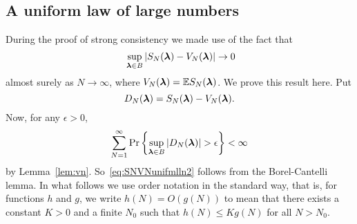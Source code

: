 \documentclass[journal]{IEEEtran}
\begin{document}
 
% 
 
 
% 
\small 
 


\normalsize
\appendix


\subsection{A uniform law of large numbers} \label{app:uniform-law-large}

During the proof of strong consistency we made use of the fact that
\begin{equation}~\label{eq:SNVNunifmlln2}
\sup_{\lambdabf \in B}\sabs{S_N(\lambdabf) - V_N(\lambdabf)} \rightarrow 0
\end{equation}
almost surely as $N\rightarrow\infty$, where $V_N(\boldsymbol{\lambda}) = {\mathbb E} S_N(\boldsymbol{\lambda})$.  We prove this result here.  Put
\[
D_N(\boldsymbol{\lambda}) = S_N(\boldsymbol{\lambda}) - V_N(\boldsymbol{\lambda}).
\]  
Now, for any $\epsilon > 0$,
\[
\sum_{N=1}^\infty \operatorname{Pr} \left\{ \sup_{\boldsymbol{\lambda} \in B}\left\vert  D_N(\boldsymbol{\lambda})  \right\vert > \epsilon \right\} < \infty
\]
by Lemma~\ref{lem:vn}.  So~\eqref{eq:SNVNunifmlln2} follows from the Borel-Cantelli lemma.   In what follows we use order notation in the standard way, that is, for functions $h$ and $g$, we write $h(N) = O(g(N))$ to mean that there exists a constant $K > 0$ and a finite $N_0$ such that $h(N) \leq K g(N)$ for all $N > N_0$.
\end{document}
